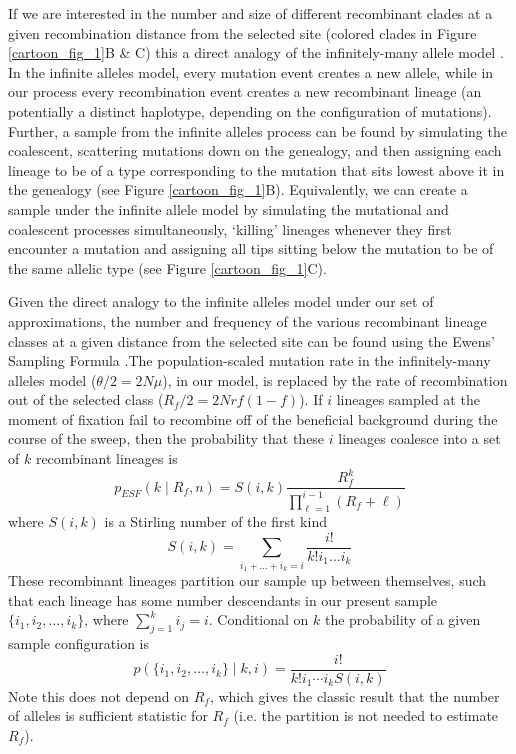 \documentclass[a4paper,10pt]{article}
\begin{document}
If we are interested in the number and size of different recombinant clades at a given recombination distance from the selected site (colored clades in Figure \ref{cartoon_fig_1}B \& C)  this a direct analogy of the infinitely-many allele model \citep{}. In the infinite alleles model, every mutation event creates a new allele, while in our process every recombination event creates a new recombinant lineage (an potentially a distinct haplotype, depending on the configuration of mutations). Further, a sample from the infinite alleles process can be found by simulating the coalescent, scattering mutations down on the genealogy, and then assigning each lineage to be of a type corresponding to the mutation that sits lowest above it in the genealogy (see Figure \ref{cartoon_fig_1}B). Equivalently, we can create a sample under the infinite allele model by simulating the mutational and coalescent processes simultaneously, `killing' lineages whenever they first encounter a mutation and assigning all tips sitting below the mutation to be of the same allelic type (see Figure \ref{cartoon_fig_1}C). 

Given the direct analogy to the infinite alleles model under our set of approximations, the number and frequency of the various recombinant lineage classes at a given distance from the selected site can be found using the Ewens' Sampling Formula \citep[ESF][]{}.The population-scaled mutation rate in the infinitely-many alleles model ($\theta/2=2N\mu$), in our model, is replaced by the rate of recombination out of the selected class ($R_{f}/2=2Nrf(1-f)$). If $i$ lineages sampled at the moment of fixation fail to recombine off of the beneficial background during the course of the sweep, then the probability that these $i$ lineages coalesce into a set of $k$ recombinant lineages is 
\begin{equation}
	p_{ESF}(k \mid R_f,n)  = S(i,k) \frac{R_f^k}{ \prod_{\ell=1}^{i-1} (R_f +\ell) }  \label{ESF1}
\end{equation}
where $S(i,k)$ is a Stirling number of the first kind
\begin{equation}
	S(i,k) = \sum_{i_1 + \dots + i_k = i} \frac{i!}{k!i_1\dots i_k}
\end{equation}
These recombinant lineages partition our sample up between themselves, such that each lineage has some number descendants in our present sample$\{i_1,i_2,\dots,i_k\}$, where $\sum_{j=1}^k i_j =i$. Conditional on $k$ the probability of a given sample configuration is
\begin{equation}
	p(\{i_1,i_2,\dots,i_k\} \mid k,i) = \frac{i!}{k! i_1\cdots i_k S(i,k)}  \label{ESF2}
\end{equation}
Note this does not depend on $R_f$, which gives the classic result that the number of alleles is sufficient statistic for $R_f$ (i.e. the partition is not needed to estimate $R_f$).
\end{document}
